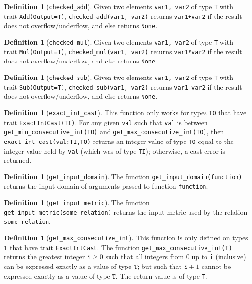 \documentclass[11pt,a4paper]{article}
\theoremstyle{definition}
\newtheorem{definition}[theorem]{Definition}
\newcommand{\T}{\texttt{T}}
\begin{document}
\begin{definition}[\texttt{checked\_add}]
     Given two elements \texttt{var1, var2} of type \texttt{T} with trait \texttt{Add(Output=T)}, \texttt{checked\_add(var1, var2)} returns \texttt{var1+var2} if the result does not overflow/underflow, and else returns \texttt{None}.
\end{definition}

\begin{definition}[\texttt{checked\_mul}]
     Given two elements \texttt{var1, var2} of type \texttt{T} with trait \texttt{Mul(Output=T)}, \texttt{checked\_mul(var1, var2)} returns \texttt{var1*var2} if the result does not overflow/underflow, and else returns \texttt{None}.
\end{definition}

\begin{definition}[\texttt{checked\_sub}]
     Given two elements \texttt{var1, var2} of type \texttt{T} with trait \texttt{Sub(Output=T)}, \texttt{checked\_sub(var1, var2)} returns \texttt{var1-var2} if the result does not overflow/underflow, and else returns \texttt{None}.
\end{definition}



\begin{definition}[\texttt{exact\_int\_cast}]
    This function only works for types \texttt{TO} that have trait \texttt{ExactIntCast(TI)}. For any given \texttt{val} such that \texttt{val} is between \texttt{get\_min\_consecutive\_int(TO)} and \texttt{get\_max\_consecutive\_int(TO)}, then \texttt{exact\_int\_cast(val:TI,TO)} returns an integer value of type \texttt{TO} equal to the integer value held by  \texttt{val} (which was of type \texttt{TI}); otherwise, a cast error is returned.
\end{definition}

\begin{definition}[\texttt{get\_input\_domain}]
    The function \texttt{get\_input\_domain(function)} returns the input domain of arguments passed to function \texttt{function}.
\end{definition}

\begin{definition}[\texttt{get\_input\_metric}]
    The function \texttt{get\_input\_metric(some\_relation)} returns the input metric used by the relation \texttt{some\_relation}.
\end{definition}

\begin{definition}[\texttt{get\_max\_consecutive\_int}]
    This function is only defined on types $\T$ that have trait \texttt{ExactIntCast}. The function \texttt{get\_max\_consecutive\_int(T)} returns the greatest integer $\texttt{i}\geq 0$ such that all integers from 0 up to \texttt{i} (inclusive) can be expressed exactly as a value of type $\T$; but such that $\texttt{i}+1$ cannot be expressed exactly as a value of type $\T$. The return value is of type \texttt{T}.
\end{definition}
\end{document}
